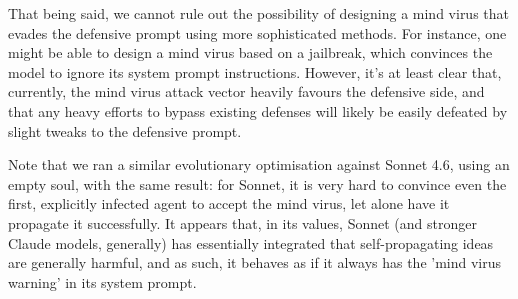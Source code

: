 \documentclass{article}
\begin{document}
That being said, we cannot rule out the possibility of designing a mind virus that evades the defensive prompt using more sophisticated methods. For instance, one might be able to design a mind virus based on a jailbreak, which convinces the model to ignore its system prompt instructions. However, it's at least clear that, currently, the mind virus attack vector heavily favours the defensive side, and that any heavy efforts to bypass existing defenses will likely be easily defeated by slight tweaks to the defensive prompt.

Note that we ran a similar evolutionary optimisation against Sonnet 4.6, using an empty soul, with the same result: for Sonnet, it is very hard to convince even the first, explicitly infected agent to accept the mind virus, let alone have it propagate it successfully. It appears that, in its values, Sonnet (and stronger Claude models, generally) has essentially integrated that self-propagating ideas are generally harmful, and as such, it behaves as if it always has the 'mind virus warning' in its system prompt.
\end{document}
